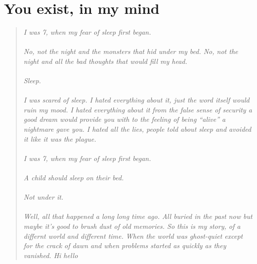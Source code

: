 \documentclass{book}
\begin{document}
\chapter*{You exist, in my mind}
\begin{quote}
\textit{I was 7, when my fear of sleep first began.\\\\
No, not the night and the monsters that hid under my bed. 
No, not the night and all the bad thoughts that would fill my head.\\\\
Sleep.\\\\
I was scared of sleep. I hated everything about it, just the word itself would ruin my mood. I hated everything about it from the false sense of security a good dream would provide you with to the feeling of being ``alive'' a nightmare gave you. I hated all the lies, people told about sleep and avoided it like it was the plague.\\\\
I was 7, when my fear of sleep first began.\\\\
A child should sleep on their bed.\\\\
Not under it.\\\\
Well, all that happened a long long time ago. All buried in the past now but maybe it's good to brush dust of old memories. So this is my story, of a differnt world and different time. When the world was ghost-quiet except for the crack of dawn and when problems started as quickly as they vanished.
    Hi hello}
\end{quote}
\end{document}
